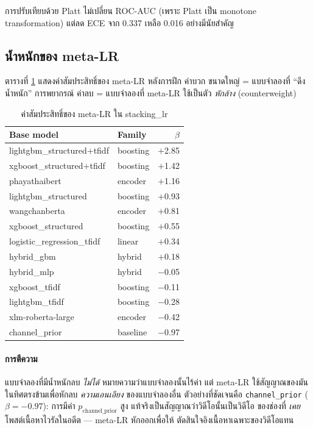 การปรับเทียบด้วย Platt ไม่เปลี่ยน ROC-AUC (เพราะ Platt เป็น monotone
transformation) แต่ลด ECE จาก 0.337 เหลือ 0.016 อย่างมีนัยสำคัญ

\subsection{น้ำหนักของ meta-LR}

ตารางที่ \ref{tab:meta-coef} แสดงค่าสัมประสิทธิ์ของ meta-LR หลังการฝึก ค่าบวก
ขนาดใหญ่ = แบบจำลองที่ ``ดึงน้ำหนัก'' การพยากรณ์ ค่าลบ = แบบจำลองที่ meta-LR
ใช้เป็นตัว \emph{หักล้าง} (counterweight)

\begin{table}[H]
\centering
\caption{ค่าสัมประสิทธิ์ของ meta-LR ใน stacking\_lr}
\label{tab:meta-coef}
\begin{tabularx}{\textwidth}{lXr}
\toprule
\textbf{Base model} & \textbf{Family} & \textbf{$\beta$} \\
\midrule
lightgbm\_structured+tfidf     & boosting & $+$2.85 \\
xgboost\_structured+tfidf      & boosting & $+$1.42 \\
phayathaibert                  & encoder  & $+$1.16 \\
lightgbm\_structured           & boosting & $+$0.93 \\
wangchanberta                  & encoder  & $+$0.81 \\
xgboost\_structured            & boosting & $+$0.55 \\
logistic\_regression\_tfidf    & linear   & $+$0.34 \\
hybrid\_gbm                    & hybrid   & $+$0.18 \\
hybrid\_mlp                    & hybrid   & $-$0.05 \\
xgboost\_tfidf                 & boosting & $-$0.11 \\
lightgbm\_tfidf                & boosting & $-$0.28 \\
xlm-roberta-large              & encoder  & $-$0.42 \\
channel\_prior                 & baseline & $-$0.97 \\
\bottomrule
\end{tabularx}
\end{table}

\paragraph{การตีความ}
แบบจำลองที่มีน้ำหนักลบ \emph{ไม่ได้} หมายความว่าแบบจำลองนั้นไร้ค่า แต่ meta-LR
ใช้สัญญาณของมันในทิศตรงข้ามเพื่อหักลบ \emph{ความเอนเอียง} ของแบบจำลองอื่น
ตัวอย่างที่ชัดเจนคือ \texttt{channel\_prior} ($\beta = -0.97$): การมีค่า
$p_{\text{channel\_prior}}$ สูง แท้จริงเป็นสัญญาณว่าวิดีโอนั้นเป็นวิดีโอ
ของช่องที่ \emph{เคย} โพสต์เนื้อหาไวรัลในอดีต — meta-LR หักออกเพื่อให้
ตัดสินใจอิงเนื้อหาเฉพาะของวิดีโอแทน

